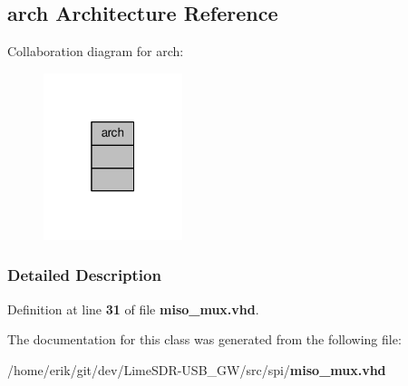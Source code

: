 \subsection{arch Architecture Reference}
\label{classmiso__mux_1_1arch}


Collaboration diagram for arch\+:\nopagebreak
\begin{figure}[H]
\begin{center}
\leavevmode
\includegraphics[width=115pt]{de/d0e/classmiso__mux_1_1arch__coll__graph}
\end{center}
\end{figure}


\subsubsection{Detailed Description}


Definition at line {\bf 31} of file {\bf miso\+\_\+mux.\+vhd}.



The documentation for this class was generated from the following file\+:\begin{DoxyCompactItemize}
\item 
/home/erik/git/dev/\+Lime\+S\+D\+R-\/\+U\+S\+B\+\_\+\+G\+W/src/spi/{\bf miso\+\_\+mux.\+vhd}\end{DoxyCompactItemize}
